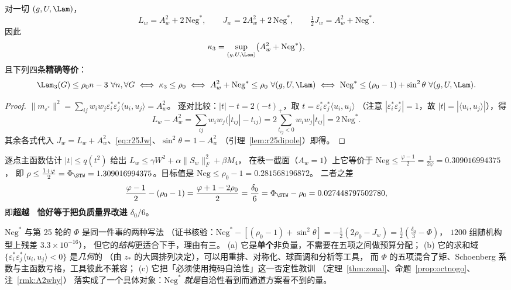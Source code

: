 \begin{theorem}\label{thm:r26neg}
对一切 $(g,U,\Lam)$，
\begin{equation}\label{eq:r26neg1}
L_w=A_w^2+2\,\mathrm{Neg}^*,\qquad
J_w=2A_w^2+2\,\mathrm{Neg}^*,\qquad
\tfrac12J_w=A_w^2+\mathrm{Neg}^* .
\end{equation}
因此
\begin{equation}\label{eq:r26neg2}
\kappa_3=\sup_{(g,U,\Lam)}\bigl(A_w^2+\mathrm{Neg}^*\bigr),
\end{equation}
且下列四条\textbf{精确等价}：
\begin{equation}\label{eq:r26neg3}
\Lam_3(G)\le\rho_0n-3\ \forall n,\forall G
\iff\kappa_3\le\rho_0
\iff A_w^2+\mathrm{Neg}^*\le\rho_0\ \forall(g,U,\Lam)
\iff\mathrm{Neg}^*\le(\rho_0-1)+\sin^2\theta\ \forall(g,U,\Lam).
\end{equation}
\end{theorem}

\begin{proof}
$\|m_{\varepsilon^*}\|^2=\sum_{ij}w_iw_j\varepsilon_i^*\varepsilon_j^*\langle u_i,u_j\rangle=A_w^2$。
逐对比较：$|t|-t=2(-t)_+$，取 $t=\varepsilon_i^*\varepsilon_j^*\langle u_i,u_j\rangle$
（注意 $|\varepsilon_i^*\varepsilon_j^*|=1$，故 $|t|=|\langle u_i,u_j\rangle|$），得
\[
L_w-A_w^2=\sum_{ij}w_iw_j\bigl(|t_{ij}|-t_{ij}\bigr)
=2\sum_{t_{ij}<0}w_iw_j|t_{ij}|=2\,\mathrm{Neg}^* .
\]
其余各式代入 $J_w=L_w+A_w^2$、\eqref{eq:r25Jw}、$\sin^2\theta=1-A_w^2$
（引理~\ref{lem:r25dipole}）即得。
\end{proof}

\begin{corollary}\label{cor:r26stw}
逐点主函数估计 $|t|\le q(t^2)$ 给出 $L_w\le\gamma W^2+\alpha\|S_w\|_F^2+\beta M_4$，
在秩一截面（$A_w=1$）上它等价于 $\mathrm{Neg}\le\frac{\varphi-1}2=\frac1{2\varphi}=0.309016994375$，
即 $\rho\le\frac{1+\varphi}2=\Phi_{\STW}=1.309016994375$。目标值是 $\mathrm{Neg}\le\rho_0-1=0.281568196872$。
二者之差
\begin{equation}\label{eq:r26gap}
\frac{\varphi-1}2-(\rho_0-1)=\frac{\varphi+1-2\rho_0}2=\frac{\delta_0}6
=\Phi_{\STW}-\rho_0=0.027448797502780 ,
\end{equation}
即\textbf{超越 \STW\ 恰好等于把负质量界改进 $\delta_0/6$}。
\end{corollary}

\begin{remark}\label{rem:r26why}
$\mathrm{Neg}^*$ 与第 25 轮的 $\Phi$ 是同一件事的两种写法
（证书核验：$\mathrm{Neg}^*-[(\rho_0-1)+\sin^2\theta]=-\frac12(2\rho_0-J_w)=\frac12(\frac{\delta_0}3-\Phi)$，
$1200$ 组随机构型上残差 $3.3\times10^{-16}$），
但它的\emph{结构}更适合下手，理由有三。
(a) 它是\textbf{单个}非负量，不需要在五项之间做预算分配；
(b) 它的求和域 $\{\varepsilon_i^*\varepsilon_j^*\langle u_i,u_j\rangle<0\}$ 是\emph{几何}的
（由 $z_*$ 的大圆排列决定），可以用重排、对称化、球面调和分析等工具，
而 $\Phi$ 的五项混合了矩、Schoenberg 系数与主函数亏格，工具彼此不兼容；
(c) 它把「必须使用掩码自洽性」这一否定性教训
（定理~\ref{thm:zonal}、命题~\ref{prop:octnogo}、注~\ref{rmk:A2why}）
落实成了一个具体对象：$\mathrm{Neg}^*$ \emph{就是}自洽性看到而通道方案看不到的量。
\end{remark}

